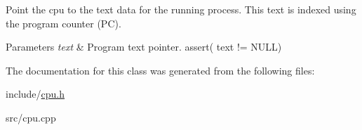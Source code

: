 \-Point the cpu to the text data for the running process. \-This text is indexed using the program counter (\-P\-C).


\begin{DoxyParams}{\-Parameters}
{\em text} & \-Program text pointer. assert( text != \-N\-U\-L\-L) \\
\hline
\end{DoxyParams}


\-The documentation for this class was generated from the following files\-:\begin{DoxyCompactItemize}
\item 
include/\hyperlink{cpu_8h}{cpu.\-h}\item 
src/cpu.\-cpp\end{DoxyCompactItemize}
